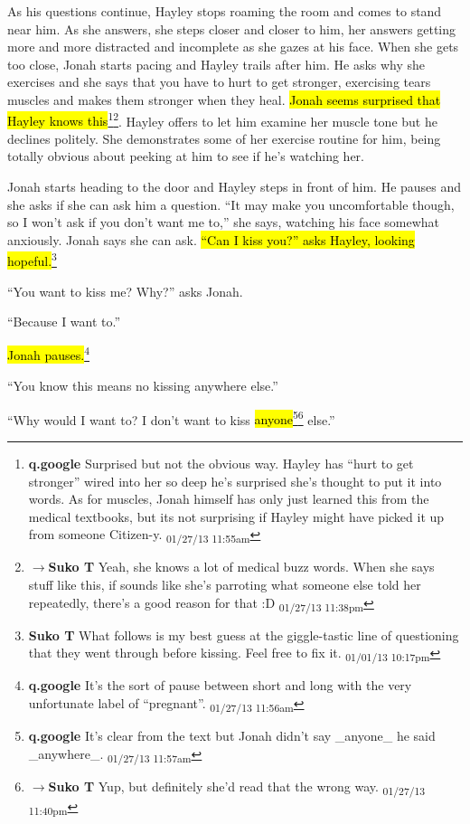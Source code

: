 As his questions continue, Hayley stops roaming the room and comes to stand near him.  As she answers, she steps closer and closer to him, her answers getting more and more distracted and incomplete as she gazes at his face.  When she gets too close, Jonah starts pacing and Hayley trails after him.  He asks why she exercises and she says that you have to hurt to get stronger, exercising tears muscles and makes them stronger when they heal. \hl{Jonah seems surprised that Hayley knows this}\footnote{\textbf{q.google }Surprised but not the obvious way.  Hayley has ``hurt to get stronger'' wired into her so deep he's surprised she's thought to put it into words.  As for muscles, Jonah himself has only just learned this from the medical textbooks, but its not surprising if Hayley might have picked it up from someone Citizen-y. \textsubscript{01/27/13 11:55am}}\footnote{$\rightarrow$\textbf{Suko T }Yeah, she knows a lot of medical buzz words.  When she says stuff like this, if sounds like she's parroting what someone else told her repeatedly, there's a good reason for that :D \textsubscript{01/27/13 11:38pm}}.  Hayley offers to let him examine her muscle tone but he declines politely.  She demonstrates some of her exercise routine for him, being totally obvious about peeking at him to see if he's watching her.



Jonah starts heading to the door and Hayley steps in front of him.  He pauses and she asks if she can ask him a question.  ``It may make you uncomfortable though, so I won't ask if you don't want me to,'' she says, watching his face somewhat anxiously.  Jonah says she can ask.  \hl{``Can I kiss you?'' asks Hayley, looking hopeful.}\footnote{\textbf{Suko T }What follows is my best guess at the giggle-tastic line of questioning that they went through before kissing.  Feel free to fix it. \textsubscript{01/01/13 10:17pm}}

``You want to kiss me? Why?'' asks Jonah.

``Because I want to.''

\hl{Jonah pauses.}\footnote{\textbf{q.google }It's the sort of pause between short and long with the very unfortunate label of ``pregnant''. \textsubscript{01/27/13 11:56am}}

``You know this means no kissing anywhere else.''

``Why would I want to?  I don't want to kiss \hl{anyone}\footnote{\textbf{q.google }It's clear from the text but Jonah didn't say \_anyone\_ he said \_anywhere\_. \textsubscript{01/27/13 11:57am}}\footnote{$\rightarrow$\textbf{Suko T }Yup, but definitely she'd read that the wrong way. \textsubscript{01/27/13 11:40pm}} else.''

